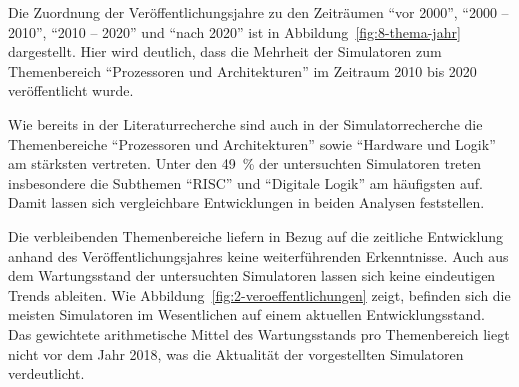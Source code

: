Die Zuordnung der Veröffentlichungsjahre zu den Zeiträumen \enquote{vor 2000}, \enquote{2000 -- 2010}, \enquote{2010 -- 2020} und \enquote{nach 2020} ist in Abbildung~\ref{fig:8-thema-jahr} dargestellt. Hier wird deutlich, dass die Mehrheit der Simulatoren zum Themenbereich \enquote{Prozessoren und Architekturen} im Zeitraum 2010 bis 2020 veröffentlicht wurde.

Wie bereits in der Literaturrecherche sind auch in der Simulatorrecherche die Themenbereiche \enquote{Prozessoren und Architekturen} sowie \enquote{Hardware und Logik} am stärksten vertreten. Unter den 49~\% der untersuchten Simulatoren treten insbesondere die Subthemen \enquote{\acs{RISC}} und \enquote{Digitale Logik} am häufigsten auf. Damit lassen sich vergleichbare Entwicklungen in beiden Analysen feststellen.

Die verbleibenden Themenbereiche liefern in Bezug auf die zeitliche Entwicklung anhand des Veröffentlichungsjahres keine weiterführenden Erkenntnisse. Auch aus dem Wartungsstand der untersuchten Simulatoren lassen sich keine eindeutigen Trends ableiten. Wie Abbildung~\ref{fig:2-veroeffentlichungen} zeigt, befinden sich die meisten Simulatoren im Wesentlichen auf einem aktuellen Entwicklungsstand. Das gewichtete arithmetische Mittel des Wartungsstands pro Themenbereich liegt nicht vor dem Jahr 2018, was die Aktualität der vorgestellten Simulatoren verdeutlicht.


